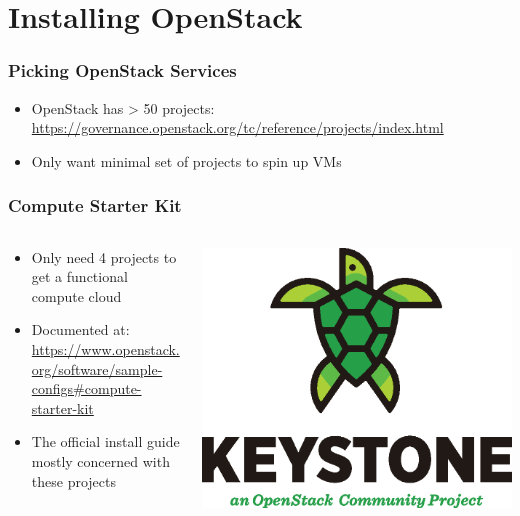 \documentclass[aspectratio=169,11pt,hyperref={colorlinks=true}]{beamer}
\begin{document}
\section{Installing OpenStack}
\begin{frame}
    \frametitle{Picking OpenStack Services}
    \begin{itemize}
        \item OpenStack has > 50 projects: \href{https://governance.openstack.org/tc/reference/projects/index.html}{https://governance.openstack.org/tc/reference/projects/index.html}
        \item Only want minimal set of projects to spin up VMs
    \end{itemize}
\end{frame}

\begin{frame}
    \frametitle{Compute Starter Kit}
    \begin{columns}[T]
        \begin{column}{.48\textwidth}
            \begin{itemize}
                \item Only need 4 projects to get a functional compute cloud
                \item Documented at:\\ \small \href{https://www.openstack.org/software/sample-configs\#compute-starter-kit}{https://www.openstack.org/software/sample-configs\#compute-starter-kit}
                \item \normalsize The official install guide mostly concerned with these projects
            \end{itemize}
        \end{column}
        \begin{column}{.48\textwidth}
            \includegraphics[height=.25\textheight]{mascots/keystone.eps}

\end{column}
\end{columns}
\end{frame}
\end{document}
